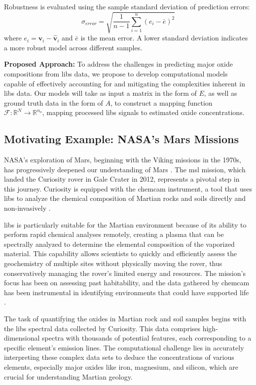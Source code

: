 Robustness is evaluated using the sample standard deviation of prediction errors:
\[
\sigma_{error} = \sqrt{\frac{1}{n-1} \sum_{i=1}^{n} (e_i - \bar{e})^2}
\]
where \( e_i = \mathbf{v}_i - \hat{\mathbf{v}}_i \) and \( \bar{e} \) is the mean error. A lower standard deviation indicates a more robust model across different samples.

\textbf{Proposed Approach:} To address the challenges in predicting major oxide compositions from \gls{libs} data, we propose to develop computational models capable of effectively accounting for and mitigating the complexities inherent in \gls{libs} data.
Our models will take as input a matrix in the form of $E$, as well as ground truth data in the form of $A$, to construct a mapping function $\mathcal{F}: \mathbb{R}^N \rightarrow \mathbb{R}^{n_{o}}$, mapping processed \gls{libs} signals to estimated oxide concentrations.

\subsection{Motivating Example: NASA's Mars Missions}
NASA's exploration of Mars, beginning with the Viking missions in the 1970s, has progressively deepened our understanding of Mars \cite{marsnasagov_vikings}.
The \gls{msl} mission, which landed the Curiosity rover in Gale Crater in 2012, represents a pivotal step in this journey.
Curiosity is equipped with the \gls{chemcam} instrument, a tool that uses \gls{libs} to analyze the chemical composition of Martian rocks and soils directly and non-invasively \cite{chemcamNasaWebsite}.

\gls{libs} is particularly suitable for the Martian environment because of its ability to perform rapid chemical analyses remotely, creating a plasma that can be spectrally analyzed to determine the elemental composition of the vaporized material.
This capability allows scientists to quickly and efficiently assess the geochemistry of multiple sites without physically moving the rover, thus conservatively managing the rover's limited energy and resources.
The mission's focus has been on assessing past habitability, and the data gathered by \gls{chemcam} has been instrumental in identifying environments that could have supported life \cite{chemcamNasaWebsite, curiosityNasaWebsite}.

The task of quantifying the oxides in Martian rock and soil samples begins with the \gls{libs} spectral data collected by Curiosity.
This data comprises high-dimensional spectra with thousands of potential features, each corresponding to a specific element's emission lines.
The computational challenge lies in accurately interpreting these complex data sets to deduce the concentrations of various elements, especially major oxides like iron, magnesium, and silicon, which are crucial for understanding Martian geology.

